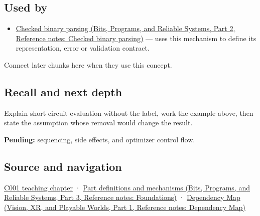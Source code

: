 \subsection{Used by}\label{appendix-2e245a6fa8d3-used-by}

\hypertarget{appendix-2e245a6fa8d3-used-by}{}

\begin{itemize}
\tightlist
\item
  \href{../01-Bits-Programs-and-Reliable-Systems-P02/main.pdf\#appendix-652d81568de9}{Checked binary parsing (Bits, Programs, and Reliable Systems, Part 2, Reference notes: Checked binary parsing)} --- uses this mechanism to define its representation, error or validation contract.
\end{itemize}

Connect later chunks here when they use this concept.

\subsection{Recall and next depth}\label{appendix-2e245a6fa8d3-recall-and-next-depth}

\hypertarget{appendix-2e245a6fa8d3-recall-and-next-depth}{}

Explain short-circuit evaluation without the label, work the example above, then state the assumption whose removal would change the result.

\textbf{Pending:} sequencing, side effects, and optimizer control flow.

\subsection{Source and navigation}\label{appendix-2e245a6fa8d3-source-and-navigation}

\hypertarget{appendix-2e245a6fa8d3-source-and-navigation}{}

\hyperref[01-foundations-i-ch001-from-a-signal-to-an-interpretation]{C001 teaching chapter} · \href{../01-Bits-Programs-and-Reliable-Systems-P03/main.pdf\#appendix-fd090d982a15}{Part definitions and mechanisms (Bits, Programs, and Reliable Systems, Part 3, Reference notes: Foundations)} · \href{../07-Vision-XR-and-Playable-Worlds-P01/main.pdf\#appendix-4ad47bdd269a}{Dependency Map (Vision, XR, and Playable Worlds, Part 1, Reference notes: Dependency Map)}
